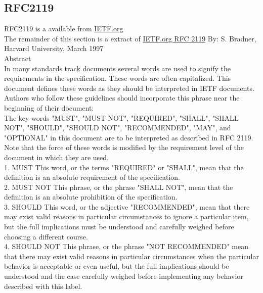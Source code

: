\subsection{RFC2119}
\label{sec:RFC2119}
\gls{RFC2119} is a available from \href{https://tools.ietf.org/html/rfc2119}{IETF.org}\\

The remainder of this section is a extract of \href{https://tools.ietf.org/html/rfc2119}{IETF.org RFC 2119}
By: S. Bradner, Harvard University, March 1997\\

Abstract\\

   In many standards track documents several words are used to signify
   the requirements in the specification.  These words are often
   capitalized.  This document defines these words as they should be
   interpreted in IETF documents.  Authors who follow these guidelines
   should incorporate this phrase near the beginning of their document:\\

      The key words "MUST", "MUST NOT", "REQUIRED", "SHALL", "SHALL
      NOT", "SHOULD", "SHOULD NOT", "RECOMMENDED",  "MAY", and
      "OPTIONAL" in this document are to be interpreted as described in
      RFC 2119.\\

   Note that the force of these words is modified by the requirement
   level of the document in which they are used.\\

1. MUST   This word, or the terms "REQUIRED" or "SHALL", mean that the
   definition is an absolute requirement of the specification.\\

2. MUST NOT   This phrase, or the phrase "SHALL NOT", mean that the
   definition is an absolute prohibition of the specification.\\

3. SHOULD   This word, or the adjective "RECOMMENDED", mean that there
   may exist valid reasons in particular circumstances to ignore a
   particular item, but the full implications must be understood and
   carefully weighed before choosing a different course.\\

4. SHOULD NOT   This phrase, or the phrase "NOT RECOMMENDED" mean that
   there may exist valid reasons in particular circumstances when the
   particular behavior is acceptable or even useful, but the full
   implications should be understood and the case carefully weighed
   before implementing any behavior described with this label.\\

